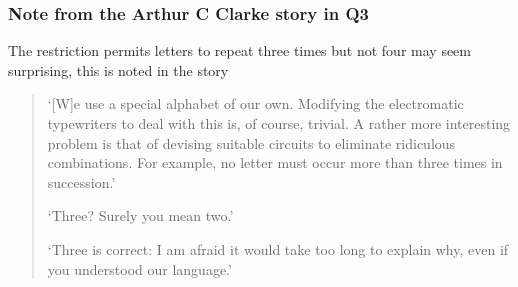 \documentclass[11pt,a4paper]{scrartcl}
\begin{document}
\subsubsection*{Note from the Arthur C Clarke story in Q3}

The restriction permits letters to repeat three times but not four may
seem surprising, this is noted in the story
\begin{quotation}
\lq{}[W]e use a special alphabet of our own. Modifying the electromatic typewriters to deal with this is, of course, trivial. A rather more interesting problem is that of devising suitable circuits to eliminate ridiculous combinations. For example, no letter must occur more than three times in succession.\rq{}

\lq{}Three? Surely you mean two.\rq{}

\lq{}Three is correct: I am afraid it would take too long to explain why, even if you understood our language.\rq{}
\end{quotation}
\end{document}
